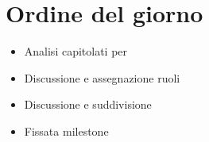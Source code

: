 \section{Ordine del giorno}
\begin{itemize}
	\item Analisi capitolati per \SdF
	\item Discussione e assegnazione ruoli
	\item Discussione e suddivisione \NdP
	\item Fissata milestone
\end{itemize}